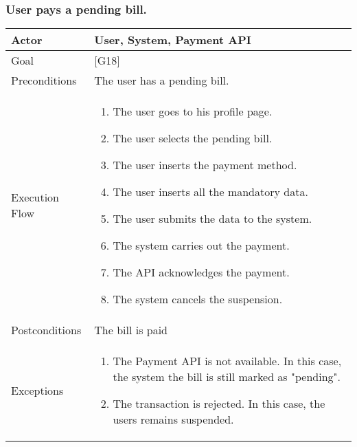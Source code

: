 \documentclass{article}
\begin{document}
  \subsubsection{User pays a pending bill.}
  \begin{tabularx}{\textwidth}{  l  X  }
    \hline
    Actor & User, System, Payment API\\
    \hline
    Goal & [G18]\\
    \hline
    Preconditions & The user has a pending bill.\\
    \hline
    Execution Flow & \begin{enumerate}
      \item{The user goes to his profile page.}
                     \item{The user selects the pending bill.}
                     \item{The user inserts the payment method.}
                     \item{The user inserts all the mandatory data.}
                     \item{The user submits the data to the system.}
                     \item{The system carries out the payment.}
                     \item{The API acknowledges the payment.}
                     \item{The system cancels the suspension.}
                    \end{enumerate}\\
    \hline
    Postconditions & The bill is paid\\
    \hline
    Exceptions & \begin{enumerate}
        \item{The Payment API is not available. In this case, the system the bill is still marked as "pending".}
        \item{The transaction is rejected. In this case, the users remains suspended.}
  \end{enumerate}\\
    \hline
  \end{tabularx}
\end{document}
